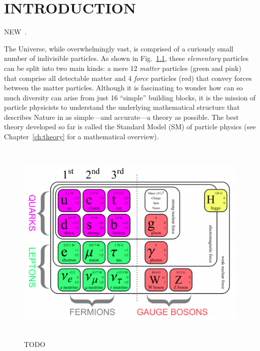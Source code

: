 \chapter{INTRODUCTION}
\label{ch:intro}

NEW~\cite{particle_data_group_review_2020}.

The Universe, while overwhelmingly vast, is comprised of a curiously small number of indivisible particles.
As shown in Fig.~\ref{fig:particular_table}, these \emph{elementary} particles can be split into two main kinds: a mere 12 \emph{matter} particles (green and pink) that comprise all detectable matter and 4 \emph{force} particles (red) that convey forces between the matter particles.
Although it is fascinating to wonder how can so much diversity can arise from just 16 ``simple'' building blocks, it is the mission of particle physicists to understand the underlying mathematical structure that describes Nature in as simple---and accurate---a theory as possible.
The best theory developed so far is called the Standard Model (SM) of particle physics (see Chapter~\ref{ch:theory} for a mathematical overview).
\begin{figure}[hbtp]
    \centering
    \includegraphics[width=15cm,height=10cm,keepaspectratio]{figures/sm/particular_table_updated.png}
        \caption{
        TODO
        }
        \label{fig:particular_table}
\end{figure}

